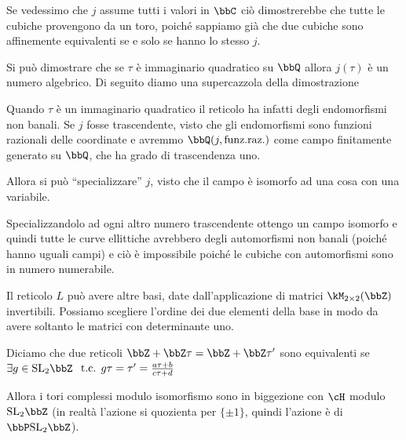 \begin{osservazione} \label{170123-j_suriettiva}
  Se vedessimo che $j$ assume tutti i valori in $\bbC$ ciò dimostrerebbe
  che tutte le cubiche provengono da un toro, poiché sappiamo già che
  due cubiche sono affinemente equivalenti se e solo se hanno lo stesso $j$.
\end{osservazione}

\begin{divagazione}
  Si può dimostrare che se $\tau$ è immaginario quadratico su $\bbQ$ allora
  $j(\tau)$ è un numero algebrico. Di seguito diamo una supercazzola della dimostrazione

  Quando $\tau$ è un immaginario quadratico il reticolo ha infatti degli
  endomorfismi non banali. Se $j$ fosse trascendente, visto che gli
  endomorfismi sono funzioni razionali delle coordinate e avremmo
  $\bbQ(j, \text{funz.raz.})$ come campo finitamente generato su $\bbQ$,
  che ha grado di trascendenza uno.

  Allora si può ``specializzare'' $j$, visto che il campo è isomorfo ad
  una cosa con una variabile.

  
  Specializzandolo ad ogni altro numero trascendente ottengo un campo
  isomorfo e quindi tutte le curve ellittiche avrebbero degli
  automorfismi non banali (poiché hanno uguali campi) e ciò è
  impossibile poiché le cubiche con automorfismi sono in numero
  numerabile.
\end{divagazione}

Il reticolo $L$ può avere altre basi, date dall'applicazione di matrici
$\kM_{2 \times 2} (\bbZ)$ invertibili. Possiamo scegliere l'ordine dei
due elementi della base in modo da avere soltanto le matrici con
determinante uno.

Diciamo che due reticoli $\bbZ + \bbZ \tau = \bbZ + \bbZ \tau'$ sono
equivalenti se $\exists g \in \SL_2 \bbZ$
$\text{ t.c. } g\tau = \tau' = \frac{a \tau + b}{c \tau + d}$

Allora i tori complessi modulo isomorfismo sono in biggezione con $\cH$
modulo $\SL_2 \bbZ$ (in realtà l'azione si quozienta per $\{\pm 1\}$,
quindi l'azione è di $\bbP\SL_2 \bbZ$).

